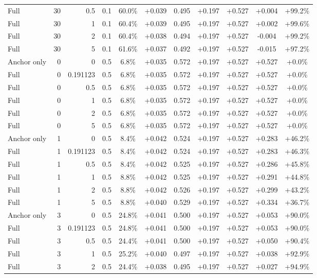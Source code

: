 \begin{table}[htbp]
\begin{tabular}{lrrrccccccc}
Full & 30 & 0.5 & 0.1 & 60.0\% & +0.039 & 0.495 & +0.197 & +0.527 & +0.004 & +99.2\% \\
Full & 30 & 1 & 0.1 & 60.4\% & +0.039 & 0.495 & +0.197 & +0.527 & +0.002 & +99.6\% \\
Full & 30 & 2 & 0.1 & 60.4\% & +0.038 & 0.494 & +0.197 & +0.527 & -0.004 & +99.2\% \\
Full & 30 & 5 & 0.1 & 61.6\% & +0.037 & 0.492 & +0.197 & +0.527 & -0.015 & +97.2\% \\
Anchor only & 0 & 0 & 0.5 & 6.8\% & +0.035 & 0.572 & +0.197 & +0.527 & +0.527 & +0.0\% \\
Full & 0 & 0.191123 & 0.5 & 6.8\% & +0.035 & 0.572 & +0.197 & +0.527 & +0.527 & +0.0\% \\
Full & 0 & 0.5 & 0.5 & 6.8\% & +0.035 & 0.572 & +0.197 & +0.527 & +0.527 & +0.0\% \\
Full & 0 & 1 & 0.5 & 6.8\% & +0.035 & 0.572 & +0.197 & +0.527 & +0.527 & +0.0\% \\
Full & 0 & 2 & 0.5 & 6.8\% & +0.035 & 0.572 & +0.197 & +0.527 & +0.527 & +0.0\% \\
Full & 0 & 5 & 0.5 & 6.8\% & +0.035 & 0.572 & +0.197 & +0.527 & +0.527 & +0.0\% \\
Anchor only & 1 & 0 & 0.5 & 8.4\% & +0.042 & 0.524 & +0.197 & +0.527 & +0.283 & +46.2\% \\
Full & 1 & 0.191123 & 0.5 & 8.4\% & +0.042 & 0.524 & +0.197 & +0.527 & +0.283 & +46.3\% \\
Full & 1 & 0.5 & 0.5 & 8.4\% & +0.042 & 0.525 & +0.197 & +0.527 & +0.286 & +45.8\% \\
Full & 1 & 1 & 0.5 & 8.8\% & +0.042 & 0.525 & +0.197 & +0.527 & +0.291 & +44.8\% \\
Full & 1 & 2 & 0.5 & 8.8\% & +0.042 & 0.526 & +0.197 & +0.527 & +0.299 & +43.2\% \\
Full & 1 & 5 & 0.5 & 8.8\% & +0.040 & 0.529 & +0.197 & +0.527 & +0.334 & +36.7\% \\
Anchor only & 3 & 0 & 0.5 & 24.8\% & +0.041 & 0.500 & +0.197 & +0.527 & +0.053 & +90.0\% \\
Full & 3 & 0.191123 & 0.5 & 24.8\% & +0.041 & 0.500 & +0.197 & +0.527 & +0.053 & +90.0\% \\
Full & 3 & 0.5 & 0.5 & 24.4\% & +0.041 & 0.500 & +0.197 & +0.527 & +0.050 & +90.4\% \\
Full & 3 & 1 & 0.5 & 25.2\% & +0.040 & 0.497 & +0.197 & +0.527 & +0.038 & +92.9\% \\
Full & 3 & 2 & 0.5 & 24.4\% & +0.038 & 0.495 & +0.197 & +0.527 & +0.027 & +94.9\% \\

\end{tabular}
\end{table}
